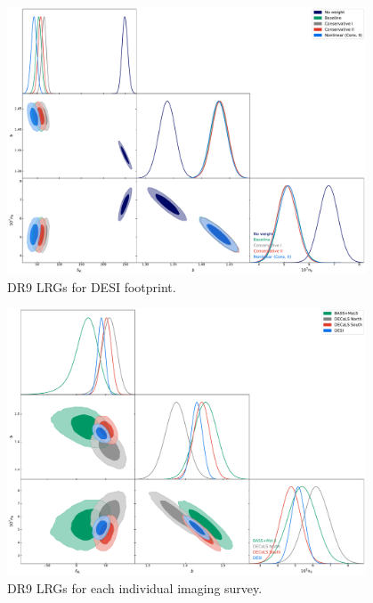 \begin{figure}
    \centering
    \includegraphics[width=0.95\textwidth]{figures/mcmc_dr9.pdf} 
    \caption{DR9 LRGs for DESI footprint.}\label{fig:mcmc_dr9}
\end{figure}

\begin{figure}
    \centering
    \includegraphics[width=0.95\textwidth]{figures/mcmc_dr9_2.pdf} 
    \caption{DR9 LRGs for each individual imaging survey.}\label{fig:mcmc_dr9_2}
\end{figure}

